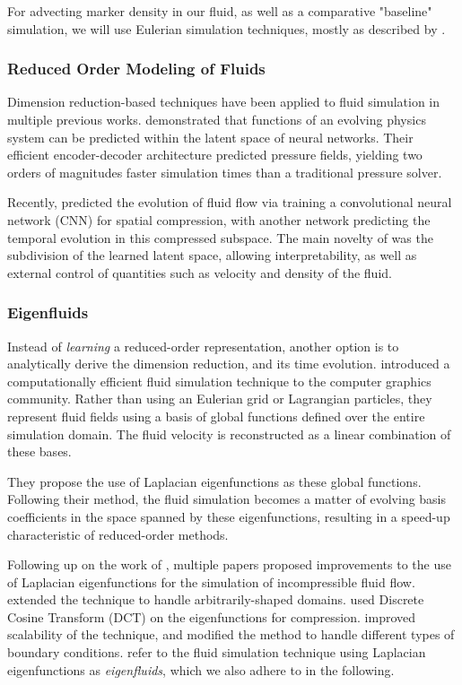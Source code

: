 For advecting marker density in our fluid, as well as a comparative "baseline"
simulation, we will use Eulerian simulation techniques, mostly as described by
\citet{StableFluids}.

\subsubsection*{Reduced Order Modeling of Fluids}
Dimension reduction-based techniques have been applied to fluid simulation in
multiple previous works. \citet{Wiewel2019LatentSP} demonstrated that functions
of an evolving physics system can be predicted within the latent space of neural
networks. Their efficient encoder-decoder architecture predicted pressure
fields, yielding two orders of magnitudes faster simulation times than
a traditional pressure solver.

Recently, \citet{LatentSpaceSubdivision} predicted the
evolution of fluid flow via training a convolutional neural network (CNN) for
spatial compression, with another network predicting the temporal evolution in
this compressed subspace.  The main novelty of \cite{LatentSpaceSubdivision} was
the subdivision of the learned latent space, allowing interpretability, as well
as external control of quantities such as velocity and density of the fluid.

\subsubsection*{Eigenfluids}
Instead of \textit{learning} a reduced-order representation, another option is
to analytically derive the dimension reduction, and its time evolution.
\citet{dewitt} introduced a computationally efficient fluid simulation technique
to the computer graphics community. Rather than using an Eulerian grid or
Lagrangian particles, they represent fluid fields using a basis of global
functions defined over the entire simulation domain. The fluid velocity is
reconstructed as a linear combination of these bases.

They propose the use of Laplacian eigenfunctions as these global functions.
Following their method, the fluid simulation becomes a matter of evolving basis
coefficients in the space spanned by these eigenfunctions, resulting in
a speed-up characteristic of reduced-order methods. 

Following up on the work of \citet{dewitt}, multiple papers proposed
improvements to the use of Laplacian eigenfunctions for the simulation of
incompressible fluid flow. \citet{ModelReductionFluidSim} extended the technique
to handle arbitrarily-shaped domains. \citet{EigenfluidCompression} used Discrete
Cosine Transform (DCT) on the eigenfunctions for compression.
\citet{scalable-eigenfluids} improved scalability of the technique, and modified
the method to handle different types of boundary conditions.
\citet{scalable-eigenfluids} refer to the fluid simulation technique using
Laplacian eigenfunctions as \textit{eigenfluids}, which we also adhere to in the
following.

